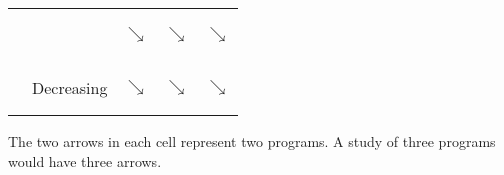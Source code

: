 \begin{table}
\begin{tabular}{cllll}
\multicolumn{1}{c}{} & \multicolumn{1}{c|}{} & \multicolumn{1}{c|}{$\searrow$}           & \multicolumn{1}{c|}{$\searrow$}       & \multicolumn{1}{c|}{\begin{rotate}{30}$\searrow$\end{rotate}}          \\ 
\multicolumn{1}{c}{} & \multicolumn{1}{c|}{Decreasing} & \multicolumn{1}{c|}{\begin{rotate}{30}$\searrow$\end{rotate}}           & \multicolumn{1}{c|}{$\searrow$}       & \multicolumn{1}{c|}{$\searrow$}          \\ \cline{3-5} 
\end{tabular}

\end{table}
\footnotesize *The two arrows in each cell represent two programs. A study of three programs would have three arrows. 